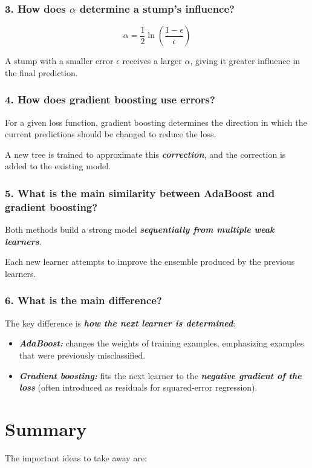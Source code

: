 \documentclass[10pt]{article}
\begin{document}
\subsubsection*{3. How does $\alpha$ determine a stump's influence?}
\[
\alpha=
\frac12\ln\left(\frac{1-\epsilon}{\epsilon}\right)
\]

A stump with a smaller error $\epsilon$ receives a larger $\alpha$, giving it greater influence in the final prediction.

\subsubsection*{4. How does gradient boosting use errors?}
For a given loss function, gradient boosting determines the direction in which the current predictions should be changed to reduce the loss.

A new tree is trained to approximate this \textbf{\textit{correction}}, and the correction is added to the existing model.

\subsubsection*{5. What is the main similarity between AdaBoost and gradient boosting?}
Both methods build a strong model \textbf{\textit{sequentially from multiple weak learners}}.

Each new learner attempts to improve the ensemble produced by the previous learners.

\subsubsection*{6. What is the main difference?}
The key difference is \textbf{\textit{how the next learner is determined}}:

\begin{itemize}
\item
\textbf{\textit{AdaBoost:}} changes the weights of training examples, emphasizing examples that were previously misclassified.

\item
\textbf{\textit{Gradient boosting:}} fits the next learner to the \textbf{\textit{negative gradient of the loss}} (often introduced as residuals for squared-error regression).

\end{itemize}
\par\endgroup

\section*{Summary}
The important ideas to take away are:
\end{document}
